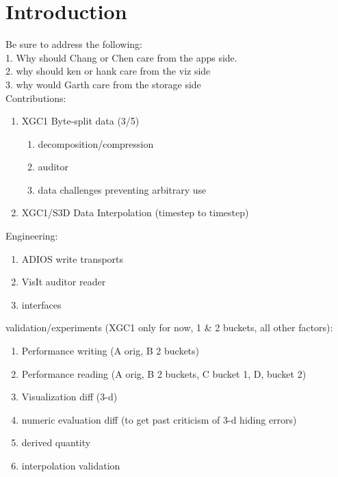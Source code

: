 \documentclass{sig-alt-gov2}
\begin{document}


\section{Introduction}

Be sure to address the following:\\
1. Why should Chang or Chen care from the apps side.\\
2. why should ken or hank care from the viz side\\
3. why would Garth care from the storage side\\


Contributions:\\
\begin{enumerate}
\item XGC1 Byte-split data (3/5)
\begin{enumerate}
\item decomposition/compression
\item auditor
\item data challenges preventing arbitrary use
\end{enumerate}
\item XGC1/S3D Data Interpolation (timestep to timestep)
\end{enumerate}

Engineering:\\
\begin{enumerate}
\item ADIOS write transports
\item VisIt auditor reader
\item interfaces
\end{enumerate}

validation/experiments (XGC1 only for now, 1 & 2 buckets, all other factors):\\
\begin{enumerate}
\item Performance writing (A orig, B 2 buckets)
\item Performance reading (A orig, B 2 buckets, C bucket 1, D, bucket 2)
\item Visualization diff (3-d)
\item numeric evaluation diff (to get past criticism of 3-d hiding errors)
\item derived quantity
\item interpolation validation
\end{enumerate}
\end{document}
